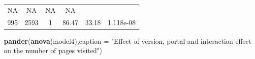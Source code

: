 \documentclass[]{article}
\newenvironment{Shaded}{\begin{snugshade}}{\end{snugshade}}
\newcommand{\KeywordTok}[1]{\textcolor[rgb]{0.13,0.29,0.53}{\textbf{#1}}}
\newcommand{\DataTypeTok}[1]{\textcolor[rgb]{0.13,0.29,0.53}{#1}}
\newcommand{\StringTok}[1]{\textcolor[rgb]{0.31,0.60,0.02}{#1}}
\newcommand{\NormalTok}[1]{#1}
\begin{document}
\begin{longtable}[]{@{}cccccc@{}}
\begin{minipage}[t]{0.06\columnwidth}
NA\strut
\end{minipage} & \begin{minipage}[t]{0.14\columnwidth}\centering\strut
NA\strut
\end{minipage} & \begin{minipage}[t]{0.09\columnwidth}\centering\strut
NA\strut
\end{minipage} & \begin{minipage}[t]{0.13\columnwidth}\centering\strut
NA\strut
\end{minipage}\tabularnewline
\begin{minipage}[t]{0.10\columnwidth}\centering\strut
995\strut
\end{minipage} & \begin{minipage}[t]{0.08\columnwidth}\centering\strut
2593\strut
\end{minipage} & \begin{minipage}[t]{0.06\columnwidth}\centering\strut
1\strut
\end{minipage} & \begin{minipage}[t]{0.14\columnwidth}\centering\strut
86.47\strut
\end{minipage} & \begin{minipage}[t]{0.09\columnwidth}\centering\strut
33.18\strut
\end{minipage} & \begin{minipage}[t]{0.13\columnwidth}\centering\strut
1.118e-08\strut
\end{minipage}\tabularnewline
\bottomrule
\end{longtable}

\begin{Shaded}
\begin{Highlighting}[]
\KeywordTok{pander}\NormalTok{(}\KeywordTok{anova}\NormalTok{(model4),}\DataTypeTok{caption =} \StringTok{"Effect of version, portal and interaction effect on the number of pages visited"}\NormalTok{)}
\end{Highlighting}
\end{Shaded}
\end{document}
